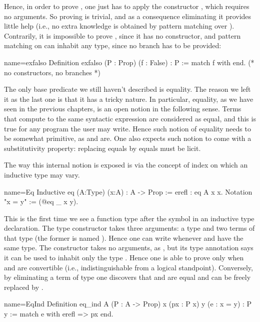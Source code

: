 Hence, in order to prove , one just has to apply the
constructor , which requires no arguments.
So proving  is trivial, and as a consequence eliminating it
provides little help (i.e., no extra knowledge is obtained by pattern matching
over ).  Contrarily, it is impossible to prove , since it has no
constructor, and pattern matching on  can inhabit any type, since no
branch has to be provided:

\begin{coq}{name=exfalso}{}
Definition exfalso (P : Prop) (f : False) : P :=
  match f with end.  (* no constructors, no branches *)
\end{coq}

The only base predicate we still haven't described is equality.  The reason we
left it as the last one is that it has a tricky nature.  In particular,
equality, as we have seen in the previous chapters, is an open notion
in the following sense.  Terms that compute to the same syntactic expression
are considered as equal, and this is true for any program the user may write.
Hence such notion of equality needs to be somewhat primitive, as
 and  are.  One also expects such notion to come
with a substitutivity property: replacing equals by equals must be licit.

The way this internal notion is exposed is via the concept of index
on which an inductive type may vary.

\begin{coq}{name=Eq}{}
Inductive eq (A:Type) (x:A) : A -> Prop := erefl : eq A x x.
Notation "x = y" := (@eq _ x y).
\end{coq}

This is the first time we see a function type after the \C{:} symbol
in an inductive type declaration.
The  type constructor takes three arguments: a type  and
two terms of that type (the former is named ).
Hence one can write  whenever  and 
have the same type.
The  constructor takes no arguments, as , but its type
annotation says it can be used to inhabit only the type .
Hence one is able to prove  only when  and  are
convertible
(i.e., indistinguishable from a logical standpoint).
Conversely, by eliminating a term
of type  one discovers that   and  are
equal and  can be freely replaced by .

\begin{coq}{name=EqInd}{}
Definition eq_ind A (P : A -> Prop) x (px : P x) y (e : x = y) : P y :=
  match e with erefl => px end.
\end{coq}

